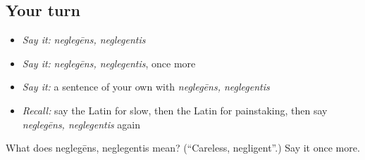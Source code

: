 \subsection*{Your turn}
\begin{itemize}
\raggedright
  \item \emph{Say it:} \emph{neglegēns, neglegentis}
  \item \emph{Say it:} \emph{neglegēns, neglegentis}, once more
  \item \emph{Say it:} a sentence of your own with \emph{neglegēns, neglegentis}
  \item \emph{Recall:} say the Latin for slow, then the Latin for painstaking, then say \emph{neglegēns, neglegentis} again
\end{itemize}

\begin{tcolorbox}[breakable,colback=teal!4,colframe=teal!35!black,title={Before you move on}]
What does neglegēns, neglegentis mean? (\textquotedblleft{}Careless, negligent\textquotedblright{}.) Say it once more.
\end{tcolorbox}
